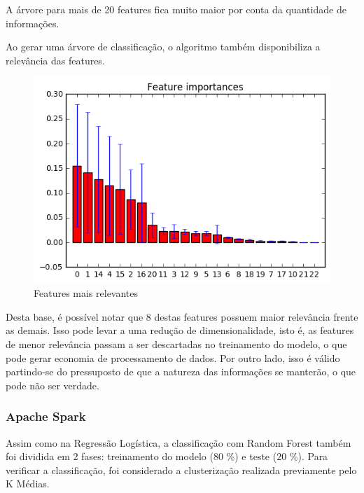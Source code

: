 A árvore para mais de 20 features fica muito maior por conta da quantidade de informações.


Ao gerar uma árvore de classificação, o algoritmo também disponibiliza a relevância das features.

\begin{figure}[!ht]
\caption{Features mais relevantes}
\centerline{\includegraphics[width=.7\textwidth]{img/tree-most-important-features}}
\end{figure}

Desta base, é possível notar que 8 destas features possuem maior relevância frente as demais. Isso pode levar a uma redução de dimensionalidade, isto é, as features de menor relevância passam a ser descartadas no treinamento do modelo, o que pode gerar economia de processamento de dados. Por outro lado, isso é válido partindo-se do pressuposto de que a natureza das informações se manterão, o que pode não ser verdade.

%
%

\subsubsection{Apache Spark}


Assim como na Regressão Logística, a classificação com Random Forest também foi dividida em 2 fases: treinamento do modelo (80 \%) e teste (20 \%). Para verificar a classificação, foi considerado a clusterização realizada previamente pelo K Médias. 



